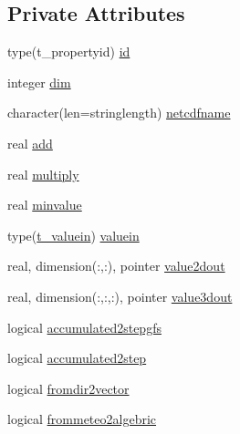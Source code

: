 \subsection*{Private Attributes}
\begin{DoxyCompactItemize}
\item 
type(t\+\_\+propertyid) \mbox{\hyperlink{structmodulenetcdfcf__2__hdf5mohid_1_1t__field_a3a8251143d45a210ac28fe9514571012}{id}}
\item 
integer \mbox{\hyperlink{structmodulenetcdfcf__2__hdf5mohid_1_1t__field_a786ece5dd594d80bd8318181063a81df}{dim}}
\item 
character(len=stringlength) \mbox{\hyperlink{structmodulenetcdfcf__2__hdf5mohid_1_1t__field_a1f9a0ec370173523d5cad1de14a9fe33}{netcdfname}}
\item 
real \mbox{\hyperlink{structmodulenetcdfcf__2__hdf5mohid_1_1t__field_a3e01ba2168b556c76e44e084d0f9b33f}{add}}
\item 
real \mbox{\hyperlink{structmodulenetcdfcf__2__hdf5mohid_1_1t__field_acb1aa8d40b2f11d0a2b497def925233c}{multiply}}
\item 
real \mbox{\hyperlink{structmodulenetcdfcf__2__hdf5mohid_1_1t__field_a0c931b56bfb6d4fab391c400726afbbc}{minvalue}}
\item 
type(\mbox{\hyperlink{structmodulenetcdfcf__2__hdf5mohid_1_1t__valuein}{t\+\_\+valuein}}) \mbox{\hyperlink{structmodulenetcdfcf__2__hdf5mohid_1_1t__field_a0c84d477dccad262fb4912d3e5e0a822}{valuein}}
\item 
real, dimension(\+:,\+:), pointer \mbox{\hyperlink{structmodulenetcdfcf__2__hdf5mohid_1_1t__field_a0120165fafaa1d6d248b29925201e7ef}{value2dout}}
\item 
real, dimension(\+:,\+:,\+:), pointer \mbox{\hyperlink{structmodulenetcdfcf__2__hdf5mohid_1_1t__field_a9d6d96f30a83e542278683d41dbe2130}{value3dout}}
\item 
logical \mbox{\hyperlink{structmodulenetcdfcf__2__hdf5mohid_1_1t__field_ab6155b2ebe000615d8c6a32e211ce794}{accumulated2stepgfs}}
\item 
logical \mbox{\hyperlink{structmodulenetcdfcf__2__hdf5mohid_1_1t__field_ae9fa1026383d344758444e98bbbb638e}{accumulated2step}}
\item 
logical \mbox{\hyperlink{structmodulenetcdfcf__2__hdf5mohid_1_1t__field_aeecc92429b9ed83eacda18c40a52ff46}{fromdir2vector}}
\item 
logical \mbox{\hyperlink{structmodulenetcdfcf__2__hdf5mohid_1_1t__field_aef95ef73f4afb8f9a9da7fb233faab20}{frommeteo2algebric}}
\item 

\end{DoxyCompactItemize}
